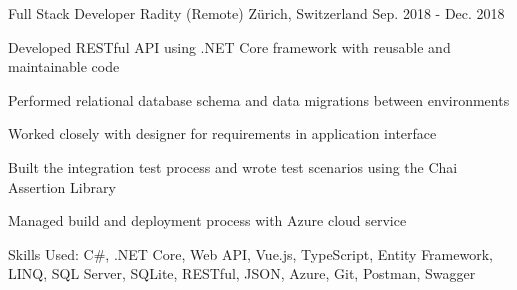 \begin{cventries}
  \cventry
    {Full Stack Developer} %
    {Radity (Remote)} %
    {Zürich, Switzerland} %
    {Sep. 2018 - Dec. 2018} %
    {
      \begin{cvitems} %
        \item {Developed RESTful API using .NET Core framework with reusable and maintainable code}
        \item {Performed relational database schema and data migrations between environments}
        \item {Worked closely with designer for requirements in application interface}
        \item {Built the integration test process and wrote test scenarios using the Chai Assertion Library}
        \item {Managed build and deployment process with Azure cloud service}
        \item {Skills Used: C\#, .NET Core, Web API, Vue.js, TypeScript, Entity Framework, LINQ, SQL Server, SQLite, RESTful, JSON, Azure, Git, Postman, Swagger}
      \end{cvitems}
    }


\end{cventries}
